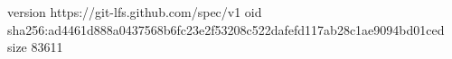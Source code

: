 version https://git-lfs.github.com/spec/v1
oid sha256:ad4461d888a0437568b6fc23e2f53208c522dafefd117ab28c1ae9094bd01ced
size 83611
